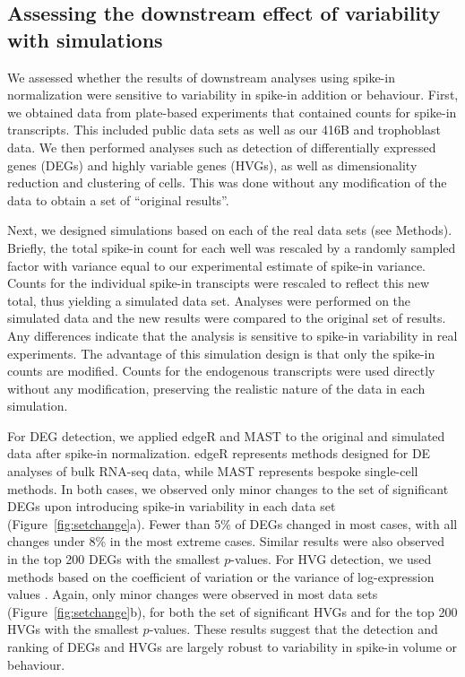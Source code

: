 \documentclass{article}
\begin{document}
\subsection{Assessing the downstream effect of variability with simulations}
We assessed whether the results of downstream analyses using spike-in normalization were sensitive to variability in spike-in addition or behaviour.
First, we obtained data from plate-based experiments that contained counts for spike-in transcripts.
This included public data sets \cite{segerstople2016single,islam2011characterization} as well as our 416B and trophoblast data.
We then performed analyses such as detection of differentially expressed genes (DEGs) and highly variable genes (HVGs), as well as dimensionality reduction and clustering of cells.
This was done without any modification of the data to obtain a set of ``original results''.

Next, we designed simulations based on each of the real data sets (see Methods).
Briefly, the total spike-in count for each well was rescaled by a randomly sampled factor with variance equal to our experimental estimate of spike-in variance.
Counts for the individual spike-in transcipts were rescaled to reflect this new total, thus yielding a simulated data set.
Analyses were performed on the simulated data and the new results were compared to the original set of results.
Any differences indicate that the analysis is sensitive to spike-in variability in real experiments.
The advantage of this simulation design is that only the spike-in counts are modified.
Counts for the endogenous transcripts were used directly without any modification, preserving the realistic nature of the data in each simulation.

For DEG detection, we applied edgeR \cite{robinson2010edgeR} and MAST \cite{finak2015mast} to the original and simulated data after spike-in normalization.
edgeR represents methods designed for DE analyses of bulk RNA-seq data, while MAST represents bespoke single-cell methods.
In both cases, we observed only minor changes to the set of significant DEGs upon introducing spike-in variability in each data set (Figure~\ref{fig:setchange}a). 
Fewer than 5\% of DEGs changed in most cases, with all changes under 8\% in the most extreme cases.
Similar results were also observed in the top 200 DEGs with the smallest $p$-values.
For HVG detection, we used methods based on the coefficient of variation \cite{brennecke2013accounting} or the variance of log-expression values \cite{lun2016stepbystep}.
Again, only minor changes were observed in most data sets (Figure~\ref{fig:setchange}b), for both the set of significant HVGs and for the top 200 HVGs with the smallest $p$-values.
These results suggest that the detection and ranking of DEGs and HVGs are largely robust to variability in spike-in volume or behaviour.
\end{document}
